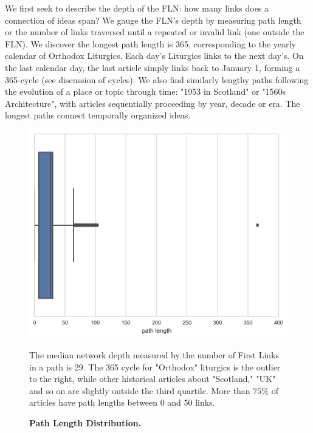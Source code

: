 \documentclass[pre,twocolumn,twoside,superscriptaddress,floatfix, aps, 10pt]{revtex4-1}
\begin{document}
We first seek to describe the depth of the FLN: how many links does a 
connection of ideas span? We gauge the FLN's depth by 
measuring path length or the number of links traversed until a repeated or invalid link (one outside the FLN). 
We discover the longest path length is 365,
corresponding to the yearly calendar of Orthodox Liturgics.
Each day's Liturgics links to the next day's. On the last calendar day, the last article simply links back to January 1, forming a 365-cycle 
(see discussion of cycles).
We also find similarly lengthy paths following the evolution of a place or topic through time: 
"1953 in Scotland" or "1560s Architecture", with articles sequentially proceeding by year, decade or era.
The longest paths connect temporally organized ideas.

\begin{figure}[tp!]
  \centering	
  \includegraphics[width=\columnwidth]{graphics/path_lengths_boxplot.png}
  \caption{
    \textbf{Path Length Distribution.}
  }
  The median network depth measured by the number of First Links in a path
  is 29. The 365 cycle for "Orthodox" liturgics is the outlier to the right, while
  other historical articles about "Scotland," "UK" and so on are slightly outside
  the third quartile. More than $75\%$ of articles have path lengths between 
  $0$ and $50$ links.

  \label{fig:Path Length Distribution}
\end{figure}
\end{document}
